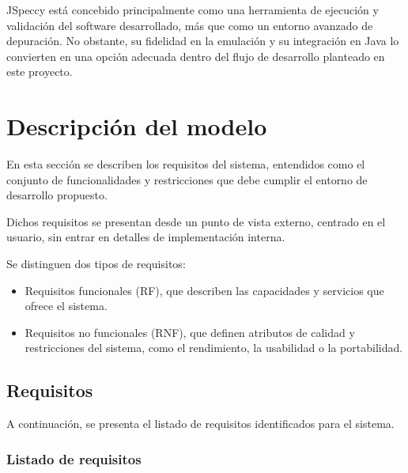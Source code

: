 \documentclass[../../main.tex]{subfiles}
\begin{document}
\par{JSpeccy está concebido principalmente como una herramienta de ejecución y validación del software desarrollado, más que como un entorno avanzado de depuración. No obstante, su fidelidad en la emulación y su integración en Java lo convierten en una opción adecuada dentro del flujo de desarrollo planteado en este proyecto.}

\clearpage

\section{Descripción del modelo}
\label{S:modelo}

\par{En esta sección se describen los requisitos del sistema, entendidos como el conjunto de funcionalidades y restricciones que debe cumplir el entorno de desarrollo propuesto.}

\par{Dichos requisitos se presentan desde un punto de vista externo, centrado en el usuario, sin entrar en detalles de implementación interna.}

\par{Se distinguen dos tipos de requisitos:}

\begin{itemize}
    \item Requisitos funcionales (RF), que describen las capacidades y servicios que ofrece el sistema.
    \item Requisitos no funcionales (RNF), que definen atributos de calidad y restricciones del sistema, como el rendimiento, la usabilidad o la portabilidad.
\end{itemize}

\subsection{Requisitos}

\par{A continuación, se presenta el listado de requisitos identificados para el sistema.}

\subsubsection{Listado de requisitos}
\end{document}

